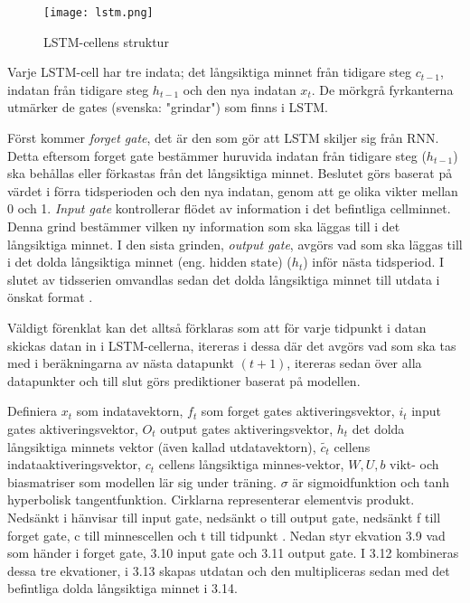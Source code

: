 \documentclass[11pt]{article}
\numberwithin{equation}{section}
\numberwithin{table}{section}
\numberwithin{figure}{section}
\begin{document}
\begin{figure}[H]
\caption{LSTM-cellens struktur \parencite[lånad från][]{yuan2019nonlinear}}
\texttt{[image: lstm.png]}
\centering
\end{figure}

Varje LSTM-cell har tre indata; det långsiktiga minnet från tidigare steg \(c_{t-1}\), indatan från tidigare steg \(h_{t-1}\) och den nya indatan \(x_{t}\). De mörkgrå fyrkanterna utmärker de gates (svenska: "grindar") som finns i LSTM. 

Först kommer \textit{forget gate}, det är den som gör att LSTM skiljer sig från RNN. Detta eftersom forget gate bestämmer huruvida indatan från tidigare steg (\(h_{t-1}\)) ska behållas eller förkastas från det långsiktiga minnet. Beslutet görs baserat på värdet i förra tidsperioden och den nya indatan, genom att ge olika vikter mellan 0 och 1. \textit{Input gate} kontrollerar flödet av information i det befintliga cellminnet. Denna grind bestämmer vilken ny information som ska läggas till i det långsiktiga minnet. I den sista grinden, \textit{output gate}, avgörs vad som ska läggas till i det dolda långsiktiga minnet (eng. hidden state) (\(h_{t}\)) inför nästa tidsperiod. I slutet av tidsserien omvandlas sedan det dolda långsiktiga minnet till utdata i önskat format \parencite[][,s.478-559]{purkait2019hands}.

Väldigt förenklat kan det alltså förklaras som  att för varje tidpunkt i datan skickas datan in i LSTM-cellerna, itereras i dessa där det avgörs vad som ska tas med i beräkningarna av nästa datapunkt $(t+1)$, itereras sedan över alla datapunkter och till slut görs prediktioner baserat på modellen. 

Definiera \(x_t\) som indatavektorn, \(f_t\) som forget gates aktiveringsvektor, \(i_t\) input gates aktiveringsvektor, \(O_t\) output gates aktiveringsvektor, \(h_t\) det dolda långsiktiga minnets vektor (även kallad utdatavektorn), \(\tilde{c_t}\) cellens indataaktiveringsvektor, \(c_t\) cellens långsiktiga minnes-vektor, \(W, U, b\) vikt- och biasmatriser som modellen lär sig under träning. \(\sigma\) är sigmoidfunktion och tanh hyperbolisk tangentfunktion. Cirklarna representerar elementvis produkt. Nedsänkt i hänvisar till input gate, nedsänkt o till output gate, nedsänkt f till forget gate, c till minnescellen och t till tidpunkt \parencite[][,s.478-559]{purkait2019hands}. Nedan styr ekvation 3.9 vad som händer i forget gate, 3.10 input gate och 3.11 output gate. I 3.12 kombineras dessa tre ekvationer, i 3.13 skapas utdatan och den multipliceras sedan med det befintliga dolda långsiktiga minnet i 3.14.
\end{document}
